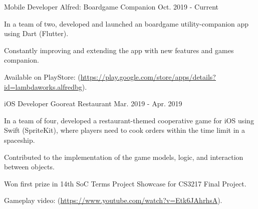 

\begin{cventries}

  \cventry
    {Mobile Developer} %
    {Alfred: Boardgame Companion} %
    {} %
    {Oct. 2019 - Current} %
    {
      \begin{cvitems} %
        \item {In a team of two, developed and launched an boardgame utility-companion app using Dart (Flutter).}
        \item {Constantly improving and extending the app with new features and games companion.}
        \item {Available on PlayStore: (\url{https://play.google.com/store/apps/details?id=lambdaworks.alfredbg}).}
      \end{cvitems}
    }

  \cventry
    {iOS Developer} %
    {Gooreat Restaurant} %
    {} %
    {Mar. 2019 - Apr. 2019} %
    {
      \begin{cvitems} %
        \item {In a team of four, developed a restaurant-themed cooperative game for iOS using Swift (SpriteKit), where players need to cook orders within the time limit in a spaceship.}
        \item {Contributed to the implementation of the game models, logic, and interaction between objects.}
        \item {Won first prize in 14th SoC Terms Project Showcase for CS3217 Final Project.}
        \item {Gameplay video: (\url{https://www.youtube.com/watch?v=Etk6JAhrhsA}).}
      \end{cvitems}
    }


\end{cventries}
